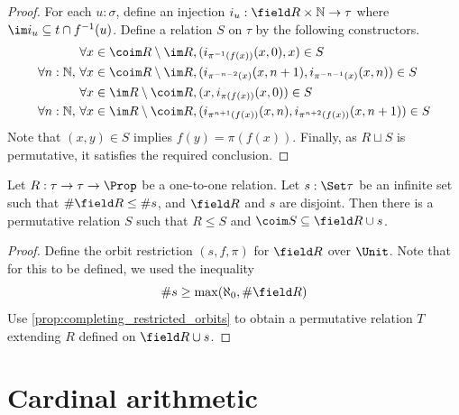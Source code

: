 \begin{proof}
  \leanok
  For each \( u : \sigma \), define an injection \( i_u : \field R \times \mathbb N \to \tau \) where \( \im i_u \subseteq t \cap f^{-1}(u) \).
  Define a relation \( S \) on \( \tau \) by the following constructors.
  \begin{align*}
    \forall x \in \coim R \setminus \im R,\, &(i_{\pi^{-1}(f(x))}(x, 0), x) \in S \\
    \forall n : \mathbb N,\, \forall x \in \coim R \setminus \im R,\, &(i_{\pi^{-n-2}(x)}(x, n+1), i_{\pi^{-n-1}(x)}(x, n)) \in S \\
    \forall x \in \im R \setminus \coim R,\, &(x, i_{\pi(f(x))}(x, 0)) \in S \\
    \forall n : \mathbb N,\, \forall x \in \im R \setminus \coim R,\, &(i_{\pi^{n+1}(f(x))}(x, n), i_{\pi^{n+2}(f(x))}(x, n+1)) \in S
  \end{align*}
  Note that \( (x, y) \in S \) implies \( f(y) = \pi(f(x)) \).
  Finally, as \( R \sqcup S \) is permutative, it satisfies the required conclusion.
\end{proof}
\begin{proposition}
  \label{prop:completing_orbits}
  \leanok
  Let \( R : \tau \to \tau \to \Prop \) be a one-to-one relation.
  Let \( s : \Set \tau \) be an infinite set such that \( \#\field R \leq \#s \), and \( \field R \) and \( s \) are disjoint.
  Then there is a permutative relation \( S \) such that \( R \leq S \) and \( \coim S \subseteq \field R \cup s \).
\end{proposition}
\begin{proof}
  \leanok
  Define the orbit restriction \( (s, f, \pi) \) for \( \field R \) over \( \Unit \).
  Note that for this to be defined, we used the inequality
  \[ \#s \geq \max(\aleph_0, \#\field R) \]
  Use \cref{prop:completing_restricted_orbits} to obtain a permutative relation \( T \) extending \( R \) defined on \( \field R \cup s \).
\end{proof}

\section{Cardinal arithmetic}

